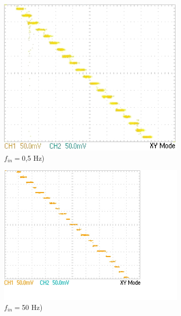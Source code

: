 \documentclass{article}
\begin{document}
\begin{figure}[h!]
  \centering
  \hfill
  \begin{subfigure}[b]{0.3\textwidth}
    \centering
    \includegraphics[width=\textwidth]{data/TEK0017_}
    \caption{$f_{in}=$0,5 Hz)}
    \label{fig:slowXY_}
  \end{subfigure}
  \hfill
  \begin{subfigure}[b]{0.3\textwidth}
    \centering
    \includegraphics[width=\textwidth]{data/TEK0000_}
    \caption{$f_{in}=$50 Hz)}
    \label{fig:midXY}
  \end{subfigure}
  \hfill
  \begin{subfigure}[b]{0.3\textwidth}

\end{subfigure}
\end{figure}
\end{document}

